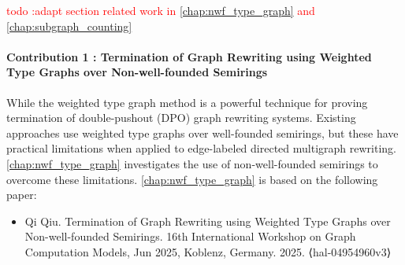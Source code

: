 \textcolor{red}{todo :adapt section related work in \autoref{chap:nwf_type_graph} and \autoref{chap:subgraph_counting}}


\paragraph{Contribution 1 : Termination of Graph Rewriting using Weighted Type Graphs over Non-well-founded Semirings} 
While the weighted type graph method is a powerful technique for proving termination of double-pushout (DPO) graph rewriting systems. 
Existing approaches use weighted type graphs over well-founded semirings, but these have practical limitations when applied to edge-labeled directed multigraph rewriting. \autoref{chap:nwf_type_graph} investigates the use of non-well-founded semirings to overcome these limitations. \autoref{chap:nwf_type_graph} is based on the following paper:
\begin{itemize}
    \item Qi Qiu. Termination of Graph Rewriting using Weighted Type Graphs over Non-well-founded Semirings. 16th International Workshop on Graph Computation Models, Jun 2025, Koblenz, Germany. 2025. ⟨hal-04954960v3⟩
\end{itemize}
 
